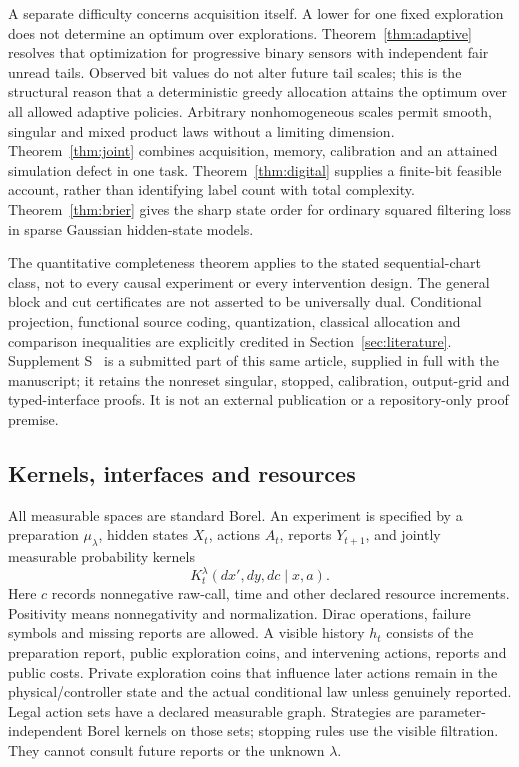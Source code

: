 A separate difficulty concerns acquisition itself. A lower for one fixed exploration does not determine an optimum over explorations. Theorem~\ref{thm:adaptive} resolves that optimization for progressive binary sensors with independent fair unread tails. Observed bit values do not alter future tail scales; this is the structural reason that a deterministic greedy allocation attains the optimum over all allowed adaptive policies. Arbitrary nonhomogeneous scales permit smooth, singular and mixed product laws without a limiting dimension. Theorem~\ref{thm:joint} combines acquisition, memory, calibration and an attained simulation defect in one task. Theorem~\ref{thm:digital} supplies a finite-bit feasible account, rather than identifying label count with total complexity. Theorem~\ref{thm:brier} gives the sharp state order for ordinary squared filtering loss in sparse Gaussian hidden-state models.

The quantitative completeness theorem applies to the stated sequential-chart class, not to every causal experiment or every intervention design. The general block and cut certificates are not asserted to be universally dual. Conditional projection, functional source coding, quantization, classical allocation and comparison inequalities are explicitly credited in Section~\ref{sec:literature}. Supplement S~\cite{companion} is a submitted part of this same article, supplied in full with the manuscript; it retains the nonreset singular, stopped, calibration, output-grid and typed-interface proofs. It is not an external publication or a repository-only proof premise.

\subsection{Kernels, interfaces and resources}
All measurable spaces are standard Borel. An experiment is specified by a preparation $\mu_\lambda$, hidden states $X_t$, actions $A_t$, reports $Y_{t+1}$, and jointly measurable probability kernels
\begin{equation}\label{eq:kernel}
 K_t^\lambda(dx',dy,dc\mid x,a).
\end{equation}
Here $c$ records nonnegative raw-call, time and other declared resource increments. Positivity means nonnegativity and normalization. Dirac operations, failure symbols and missing reports are allowed. A visible history $h_t$ consists of the preparation report, public exploration coins, and intervening actions, reports and public costs. Private exploration coins that influence later actions remain in the physical/controller state and the actual conditional law unless genuinely reported. Legal action sets have a declared measurable graph. Strategies are parameter-independent Borel kernels on those sets; stopping rules use the visible filtration. They cannot consult future reports or the unknown $\lambda$.


